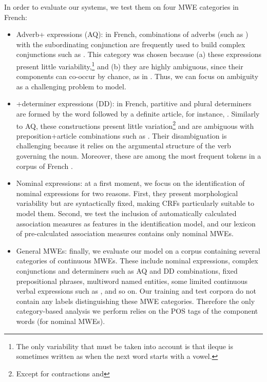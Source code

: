 \documentclass[output=paper,
modfonts
]{langscibook}
\begin{document}
In order to evaluate our systems, we test them on four MWE categories in French:

\begin{itemize}
\item Adverb+ expressions (AQ): in French, combinations of adverbs (such as ) with the subordinating conjunction  are frequently used to build complex conjunctions such as . This category was chosen because (a) these expressions present little variability,\footnote{The only variability that must be taken into account is that ile{que} is sometimes written as  when the next word starts with a vowel.} and (b) they are highly ambiguous, since their components can co-occur by chance, as in . Thus, we can focus on ambiguity as a challenging problem to model.
\item {}+determiner expressions (DD): in French, partitive and plural determiners are formed by the word  followed by a definite article, for instance, . Similarly to AQ, these constructions present little variation\footnote{Except for contractions  and } and are ambiguous with preposition+article combinations such as . Their disambiguation is challenging because it relies on the argumental structure of the verb governing the noun. Moreover, these are among the most frequent tokens in a corpus of French \citep{nasr:acl:2015}.
\item Nominal expressions: at a first moment, we focus on the identification of nominal expressions for two reasons. First, they present morphological variability but are syntactically fixed, making CRFs particularly suitable to model them. Second, we test the inclusion of automatically calculated association measures as features in the identification model, and our lexicon of pre-calculated association measures contains only nominal MWEs.
\item General MWEs: finally, we evaluate our model on a corpus containing several categories of continuous MWEs. These include nominal expressions, complex conjunctions and determiners such as AQ and DD combinations, fixed prepositional phrases, multiword named entities, some limited continuous verbal expressions such as , and so on. Our training and test corpora do not contain any labels distinguishing these MWE categories. Therefore the only category-based analysis we perform relies on the POS tags of the component words (for nominal MWEs).
\end{itemize}
\end{document}
